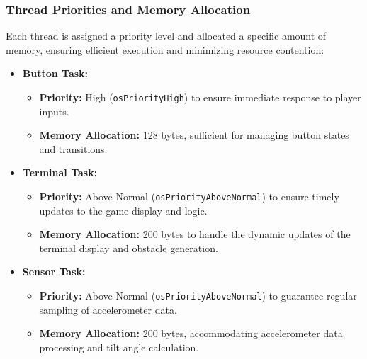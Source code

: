 \documentclass[conference]{IEEEtran}
\begin{document}
\subsubsection*{Thread Priorities and Memory Allocation}  
Each thread is assigned a priority level and allocated a specific amount of memory, ensuring efficient execution and minimizing resource contention:  
\begin{itemize}  
    \item \textbf{Button Task:}  
        \begin{itemize}  
            \item \textbf{Priority:} High (\texttt{osPriorityHigh}) to ensure immediate response to player inputs.  
            \item \textbf{Memory Allocation:} 128 bytes, sufficient for managing button states and transitions.  
        \end{itemize}  

    \item \textbf{Terminal Task:}  
        \begin{itemize}  
            \item \textbf{Priority:} Above Normal (\texttt{osPriorityAboveNormal}) to ensure timely updates to the game display and logic.  
            \item \textbf{Memory Allocation:} 200 bytes to handle the dynamic updates of the terminal display and obstacle generation.  
        \end{itemize}  

    \item \textbf{Sensor Task:}  
        \begin{itemize}  
            \item \textbf{Priority:} Above Normal (\texttt{osPriorityAboveNormal}) to guarantee regular sampling of accelerometer data.  
            \item \textbf{Memory Allocation:} 200 bytes, accommodating accelerometer data processing and tilt angle calculation.  
        \end{itemize}  
\end{itemize}  
\end{document}
